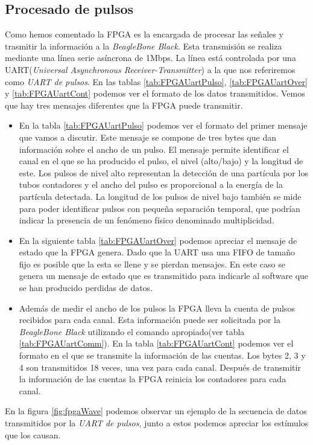        \subsection{Procesado de pulsos}
            Como hemos comentado la FPGA es la encargada de procesar las señales y trasmitir la información a la \emph{BeagleBone Black}. Esta
            transmisión se realiza mediante una línea serie asíncrona de 1Mbps. La línea está controlada por una UART(\emph{Universal Asynchronous
            Receiver-Transmitter}) a la que nos referiremos como \emph{UART de pulsos}. En las tablas \ref{tab:FPGAUartPulso},
            \ref{tab:FPGAUartOver} y \ref{tab:FPGAUartCont} podemos ver el formato de los datos transmitidos. Vemos que hay tres mensajes
            diferentes que la FPGA puede transmitir.
            \begin{itemize}
                \item	En la tabla \ref{tab:FPGAUartPulso} podemos ver el formato del primer mensaje que vamos a discutir. Este mensaje se
                    compone de tres bytes que dan información sobre el ancho de un pulso. El mensaje permite identificar el canal en el
                    que se ha producido el pulso, el nivel (alto/bajo) y la longitud de este. Los pulsos de nivel alto representan la
                    detección de una partícula por los tubos contadores y el ancho del pulso es proporcional a la energía de la partícula
                    detectada. La longitud de los pulsos de nivel bajo también se mide para poder identificar pulsos con pequeña
                    separación temporal, que podrían indicar la presencia de un fenómeno físico denominado multiplicidad.
                \item 	En la siguiente tabla \ref{tab:FPGAUartOver} podemos apreciar el mensaje de estado que la FPGA genera. Dado que la UART usa
                    una FIFO de tamaño fijo es posible que la esta se llene y se pierdan mensajes. En este caso se genera un mensaje de
                    estado que es transmitido para indicarle al software que se han producido perdidas de datos.
                \item	Además de medir el ancho de los pulsos la FPGA lleva la cuenta de pulsos recibidos para cada canal. Esta información
                    puede ser solicitada por la \emph{BeagleBone Black} utilizando el comando apropiado(ver tabla \ref{tab:FPGAUartComm}). En la
                    tabla \ref{tab:FPGAUartCont} podemos ver el formato en el que se transmite la información de las cuentas. Los bytes 2,
                    3 y 4 son transmitidos 18 veces, una vez para cada canal. Después de transmitir la información de las cuentas la FPGA
                    reinicia los contadores para cada canal.
            \end{itemize}
            En la figura \ref{fig:fpgaWave} podemos observar un ejemplo de la secuencia de datos transmitidos por la \emph{UART de pulsos}, junto a
            estos podemos apreciar los estímulos que los causan. 

